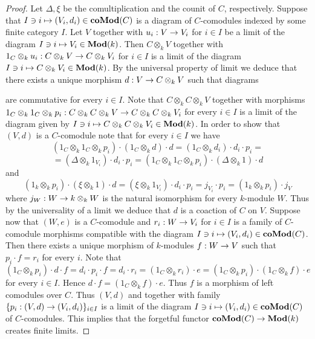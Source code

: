 \begin{proof}
Let $\Delta,\xi$ be the comultiplication and the counit of $C$, respectively. Suppose that $I\ni i\mapsto (V_i,d_i)\in \mathbf{coMod}(C)$ is a diagram of $C$-comodules indexed by some finite category $I$. Let $V$ together with $u_i:V\rightarrow V_i$ for $i\in I$ be a limit of the diagram $I\ni i\mapsto V_i\in \mathbf{Mod}(k)$. Then $C\otimes_{k}V$ together with $1_C\otimes_{k}u_i:C\otimes_{k}V\rightarrow C\otimes_{k}V_i$ for $i\in I$ is a limit of the diagram $I\ni i\mapsto C\otimes_{k}V_i\in \mathbf{Mod}(k)$. By the universal property of limit we deduce that there exists a unique morphism $d:V\rightarrow C\otimes_{k}V$ such that diagrams 
\begin{center}
\end{center} 
are commutative for every $i\in I$. Note that $C\otimes_{k}C\otimes_{k}V$ together with morphisms $1_C\otimes_{k}1_C\otimes_{k}p_i:C\otimes_{k}C\otimes_{k}V\rightarrow C\otimes_{k}C\otimes_{k}V_i$ for every $i\in I$ is a limit of the diagram given by $I\ni i\mapsto C\otimes_{k}C\otimes_{k}V_i\in \mathbf{Mod}(k)$. In order to show that $(V,d)$ is a $C$-comodule note that for every $i\in I$ we have
$$\left(1_C\otimes_{k}1_C\otimes_{k}p_i\right)\cdot \left(1_C\otimes_{k}d\right)\cdot d=\left(1_C\otimes_{k}d_i\right)\cdot d_i\cdot p_i=$$
$$=\left(\Delta\otimes_{k}1_{V_i}\right)\cdot d_i\cdot p_i=\left(1_C\otimes_{k}1_C\otimes_{k}p_i\right)\cdot \left(\Delta\otimes_{k}1\right)\cdot d$$
and
$$\left(1_{k}\otimes_{k}p_i\right)\cdot \left(\xi\otimes_{k}1\right)\cdot d= \left(\xi\otimes_{k}1_{V_i}\right)\cdot d_i\cdot p_i=j_{V_i}\cdot p_i=\left(1_{k}\otimes_{k}p_i\right)\cdot j_V$$
where $j_W:W\rightarrow k\otimes_{k}W$ is the natural isomorphism for every $k$-module $W$. Thus by the universality of a limit we deduce that $d$ is a coaction of $C$ on $V$. Suppose now that $(W,e)$ is a $C$-comodule and $r_i:W\rightarrow V_i$ for $i\in I$ is a family of $C$-comodule morphisms compatible with the diagram $I\ni i\mapsto (V_i,d_i)\in \mathbf{coMod}(C)$. Then there exists a unique morphism of $k$-modules $f:W\rightarrow V$ such that $p_i\cdot f=r_i$ for every $i$. Note that
$$(1_C\otimes_{k}p_i)\cdot d\cdot f= d_i\cdot p_i\cdot f=d_i\cdot r_i=\left(1_C\otimes_{k}r_i\right)\cdot e=\left(1_C\otimes_{k}p_i\right)\cdot \left(1_C\otimes_{k}f\right)\cdot e$$ 
for every $i\in I$. Hence $d\cdot f=\left(1_C\otimes_{k}f\right)\cdot e$. Thus $f$ is a morphism of left comodules over $C$. Thus $(V,d)$ and together with family $\{p_i:(V,d)\rightarrow (V_i,d_i)\}_{i\in I}$ is a limit of the diagram $I\ni i\mapsto (V_i,d_i)\in \mathbf{coMod}(C)$ of $C$-comodules. This implies that the forgetful functor $\mathbf{coMod}(C)\rightarrow \mathbf{Mod}(k)$ creates finite limits.
\end{proof}

